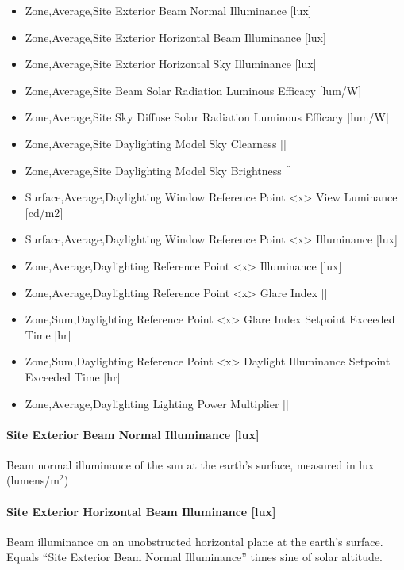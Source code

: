\begin{itemize}
\item
  Zone,Average,Site Exterior Beam Normal Illuminance {[}lux{]}
\item
  Zone,Average,Site Exterior Horizontal Beam Illuminance {[}lux{]}
\item
  Zone,Average,Site Exterior Horizontal Sky Illuminance {[}lux{]}
\item
  Zone,Average,Site Beam Solar Radiation Luminous Efficacy {[}lum/W{]}
\item
  Zone,Average,Site Sky Diffuse Solar Radiation Luminous Efficacy {[}lum/W{]}
\item
  Zone,Average,Site Daylighting Model Sky Clearness {[]}
\item
  Zone,Average,Site Daylighting Model Sky Brightness {[]}
\item
  Surface,Average,Daylighting Window Reference Point <x> View Luminance {[}cd/m2{]}
\item
  Surface,Average,Daylighting Window Reference Point <x> Illuminance {[}lux{]}
\item
  Zone,Average,Daylighting Reference Point <x> Illuminance {[}lux{]}
\item
  Zone,Average,Daylighting Reference Point <x> Glare Index {[]}
\item
  Zone,Sum,Daylighting Reference Point <x> Glare Index Setpoint Exceeded Time {[}hr{]}
\item
  Zone,Sum,Daylighting Reference Point <x> Daylight Illuminance Setpoint Exceeded Time {[}hr{]}
\item
  Zone,Average,Daylighting Lighting Power Multiplier {[]}
\end{itemize}

\paragraph{Site Exterior Beam Normal Illuminance {[}lux{]}}\label{site-exterior-beam-normal-illuminance-lux}

Beam normal illuminance of the sun at the earth's surface, measured in lux (lumens/m\(^{2}\))

\paragraph{Site Exterior Horizontal Beam Illuminance {[}lux{]}}\label{site-exterior-horizontal-beam-illuminance-lux}

Beam illuminance on an unobstructed horizontal plane at the earth's surface. Equals ``Site Exterior Beam Normal Illuminance'' times sine of solar altitude.

